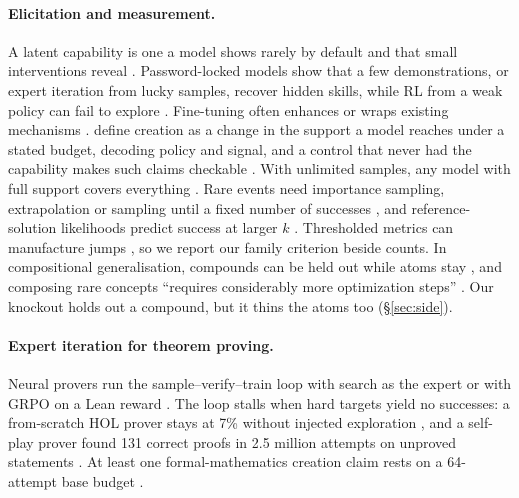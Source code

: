 \paragraph{Elicitation and measurement.} A latent capability is one a model shows rarely by default and that small
interventions reveal \citep{hofstatter2025elicitation,vanderweij2024sandbagging}. Password-locked models show that a few
demonstrations, or expert iteration from lucky samples, recover hidden skills, while RL from a weak policy can fail to
explore \citep{greenblatt2024passwordlocked}. Fine-tuning often enhances or wraps existing mechanisms
\citep{prakash2024finetuning,jain2023mechanistically}. \citet{li2026elicitcreate} define creation as a change in the
support a model reaches under a stated budget, decoding policy and signal, and a control that never had the capability
makes such claims checkable \citep{deeb2024unlearning}. With unlimited samples, any model with full support covers
everything \citep{brown2024monkeys}. Rare events need importance sampling, extrapolation or sampling until a fixed number of successes
\citep{wu2024rareoutputs,jones2025forecasting,hu2023passuntil}, and reference-solution likelihoods predict success at
larger $k$ \citep{schaeffer2025generative}. Thresholded metrics can manufacture jumps \citep{schaeffer2023mirage}, so we report
our family criterion beside counts. In compositional generalisation, compounds can be held out while atoms stay
\citep{keysers2020cfq}, and composing rare concepts ``requires considerably more optimization steps''
\citep{okawa2023multiplicative}. Our knockout holds out a compound, but it thins the atoms too (\S\ref{sec:side}).

\paragraph{Expert iteration for theorem proving.} Neural provers run the sample--verify--train loop with search as the
expert \citep{polu2020gptf,polu2022curriculum,lample2022htps,wu2024internlmstepprover,xin2025bfsprover} or with GRPO
on a Lean reward \citep{xin2024deepseekprover}. The loop stalls when hard targets yield no successes: a from-scratch HOL
prover stays at 7\% without injected exploration \citep{bansal2019deepholzero}, and a self-play prover found 131 correct
proofs in 2.5 million attempts on unproved statements \citep{dong2025stp}. At least one formal-mathematics creation claim
rests on a 64-attempt base budget \citep{burton2026diversity}.
